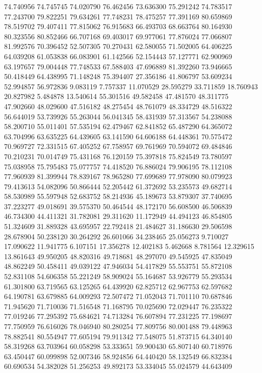 74.740956
74.745745
74.020790
76.462456
73.636300
75.291242
74.783517
77.243700
79.822251
79.634261
77.748231
78.475257
77.391169
80.659869
78.519702
79.407411
77.815062
76.915683
66.493703
68.663764
80.164930
80.323556
80.852466
66.707168
69.403017
69.977061
77.876024
77.066807
81.992576
70.396452
52.507305
70.270431
62.580055
71.502005
64.406225
64.039208
61.053838
66.083901
61.142566
52.154443
57.127771
62.900969
63.197657
79.004448
77.748533
67.588403
47.696889
81.392260
73.946665
50.418449
64.438995
71.148248
75.394407
27.356186
41.806797
53.609234
52.994857
56.972836
9.083119
7.757337
11.070529
28.595279
33.711859
18.760943
20.827982
5.484878
13.540614
55.301516
49.582458
47.481570
48.311775
47.902660
48.029600
47.516182
48.275454
48.761079
48.334729
48.516322
56.644019
53.739926
55.263044
56.041345
58.431939
57.313567
54.238088
58.200710
55.011401
57.535194
62.479467
62.841852
65.487290
64.365072
63.704996
63.635225
64.439605
63.141590
64.606188
64.448361
70.575472
70.969727
72.331515
67.405252
67.758957
69.761969
70.594072
69.484846
70.210231
70.014749
75.431168
76.120159
75.397818
75.824549
73.780597
75.038958
75.795483
75.077757
74.418520
76.886024
79.906195
78.112108
77.960939
81.399944
78.839167
78.965280
77.699689
77.978090
80.079923
79.413613
54.082096
50.866444
52.205442
61.372692
53.235573
49.682714
58.530989
55.597948
52.683752
58.214936
45.189673
53.879307
37.740695
37.223277
49.018691
39.575370
50.464544
48.172170
56.608500
46.506839
46.734300
44.411321
31.782081
29.311620
11.172949
44.494123
46.854805
51.324609
31.889328
43.695957
22.792418
21.484627
31.186630
29.506598
28.678904
50.238120
30.264292
26.601066
34.238465
25.056273
9.710027
17.090622
11.941775
6.107151
17.356278
12.402183
5.462668
8.781564
12.329615
13.861643
49.950205
48.820316
49.718681
48.297070
49.545925
47.835049
48.862249
50.458411
49.039122
47.946034
54.417829
55.553751
55.872108
52.831108
54.606358
55.221249
58.909024
55.164687
53.926779
55.293534
61.301800
63.719565
63.125265
64.439920
62.825712
62.967753
62.597682
64.190781
63.679885
64.009293
72.507472
71.052043
71.701110
70.687846
71.945620
71.710036
71.516548
71.168795
70.025690
72.029447
76.235322
77.019246
77.295392
75.684621
74.713284
76.607894
77.231225
77.198697
77.750959
76.616026
78.046940
80.280254
77.809756
80.001488
79.448963
78.882541
80.554947
77.605194
79.911342
77.548075
51.873715
64.340140
58.319268
63.703964
60.058298
53.333651
59.900430
65.807140
60.718976
63.450447
60.099898
52.007346
58.924856
64.440420
58.132549
66.832384
60.690534
54.382028
51.256253
49.892173
53.334045
55.024579
44.643409
